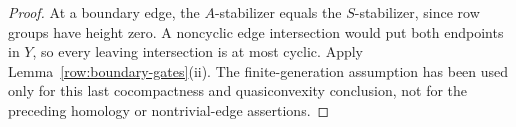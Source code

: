 \begin{proof}
At a boundary edge, the \(A\)-stabilizer equals the \(S\)-stabilizer,
since row groups have height zero. A noncyclic edge intersection
would put both endpoints in \(Y\), so every leaving intersection
is at most cyclic. Apply Lemma~\ref{row:boundary-gates}(ii).
The finite-generation assumption has been used only for this last
cocompactness and quasiconvexity conclusion, not for the preceding
homology or nontrivial-edge assertions.
\end{proof}
